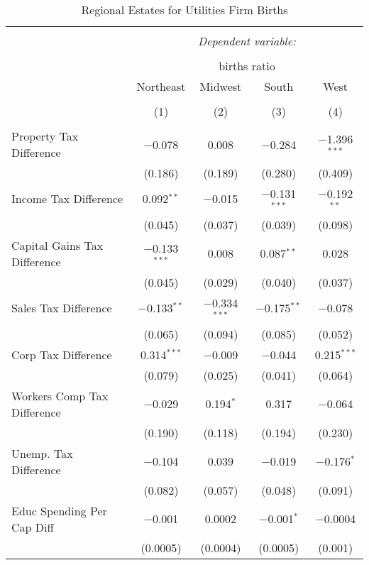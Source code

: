 
\begin{table}[!htbp] \centering 
  \caption{Regional Estates for  Utilities Firm Births} 
  \label{} 
\begin{tabular}{@{\extracolsep{5pt}}lcccc} 
\\[-1.8ex]\hline 
\hline \\[-1.8ex] 
 & \multicolumn{4}{c}{\textit{Dependent variable:}} \\ 
\cline{2-5} 
\\[-1.8ex] & \multicolumn{4}{c}{births ratio} \\ 
 & Northeast & Midwest & South & West \\ 
\\[-1.8ex] & (1) & (2) & (3) & (4)\\ 
\hline \\[-1.8ex] 
 Property Tax Difference & $-$0.078 & 0.008 & $-$0.284 & $-$1.396$^{***}$ \\ 
  & (0.186) & (0.189) & (0.280) & (0.409) \\ 
  Income Tax Difference & 0.092$^{**}$ & $-$0.015 & $-$0.131$^{***}$ & $-$0.192$^{**}$ \\ 
  & (0.045) & (0.037) & (0.039) & (0.098) \\ 
  Capital Gains Tax Difference & $-$0.133$^{***}$ & 0.008 & 0.087$^{**}$ & 0.028 \\ 
  & (0.045) & (0.029) & (0.040) & (0.037) \\ 
  Sales Tax Difference & $-$0.133$^{**}$ & $-$0.334$^{***}$ & $-$0.175$^{**}$ & $-$0.078 \\ 
  & (0.065) & (0.094) & (0.085) & (0.052) \\ 
  Corp Tax Difference & 0.314$^{***}$ & $-$0.009 & $-$0.044 & 0.215$^{***}$ \\ 
  & (0.079) & (0.025) & (0.041) & (0.064) \\ 
  Workers Comp Tax Difference & $-$0.029 & 0.194$^{*}$ & 0.317 & $-$0.064 \\ 
  & (0.190) & (0.118) & (0.194) & (0.230) \\ 
  Unemp. Tax Difference & $-$0.104 & 0.039 & $-$0.019 & $-$0.176$^{*}$ \\ 
  & (0.082) & (0.057) & (0.048) & (0.091) \\ 
  Educ Spending Per Cap Diff & $-$0.001 & 0.0002 & $-$0.001$^{*}$ & $-$0.0004 \\ 
  & (0.0005) & (0.0004) & (0.0005) & (0.001) \\ 

\end{tabular}
\end{table}

